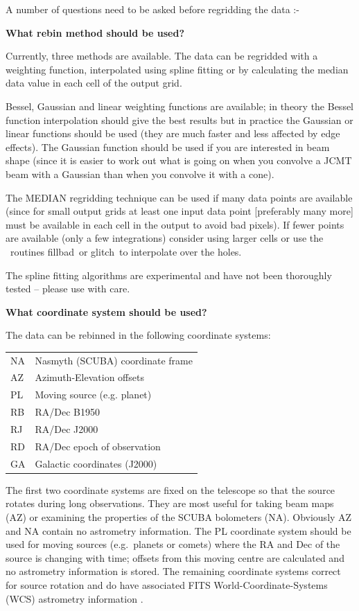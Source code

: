 \documentclass[twoside,11pt]{article}
\newcommand{\Kappa}{\xref{{\sc{Kappa}}}{sun95}{}}
\newcommand{\task}[1]{{\sf #1}}
\newcommand{\fillbad}{\xref{\task{fillbad}}{sun95}{FILLBAD}}
\newcommand{\glitch}{\xref{\task{glitch}}{sun95}{GLITCH}}
\newcommand{\xref}[3]{#1}
\renewcommand{\_}{\texttt{\symbol{95}}}
\begin{document}
A number of questions need to be asked before regridding the data :-
\begin{description}
\item {\bf What rebin method should be used?}

Currently, three methods are available. The data can be regridded with a
weighting function, interpolated using spline fitting or by calculating
the median data value in each cell of the output grid.

Bessel, Gaussian and linear weighting functions are available; in theory the
Bessel function interpolation should give the best results but in practice the
Gaussian or linear functions should be used (they are much faster and less
affected by edge effects).  The Gaussian function should be used if you are
interested in beam shape (since it is easier to work out what is going on when
you convolve a JCMT beam with a Gaussian than when you convolve it with a
cone).

The MEDIAN regridding technique can be used if many data points are 
available (since for small output grids at least one input data point
[preferably many more] must be
available in each cell in the output to avoid bad pixels). If fewer
points are available (only a few integrations) consider using larger cells
or use the \Kappa\ routines \fillbad\ or \glitch\ to interpolate over the
holes.

The spline fitting algorithms are experimental and have
not been thoroughly tested -- please use with care.

\item {\bf What coordinate system should be used?}

The data can be rebinned in the following coordinate systems:

\begin{tabular}{ll}
NA & Nasmyth (SCUBA) coordinate frame\\
AZ & Azimuth-Elevation offsets\\
PL & Moving source (e.g. planet) \\
RB & RA/Dec B1950 \\
RJ & RA/Dec J2000 \\
RD & RA/Dec epoch of observation\\
GA & Galactic coordinates (J2000) \\
\end{tabular}

The first two coordinate systems are fixed on the telescope so that the source
rotates during long observations. They are most useful for taking beam maps
(AZ) or examining the properties of the SCUBA bolometers (NA). Obviously AZ
and NA contain no astrometry information. The PL coordinate system should be
used for moving sources (e.g.\ planets or comets) where the RA and Dec of the
source is changing with time; offsets from this moving centre are calculated
and no astrometry information is stored.  The remaining coordinate systems
correct for source rotation and do have associated FITS
World-Coordinate-Systems (WCS) astrometry information \cite{WCS,ast}.


\end{description}
\end{document}
